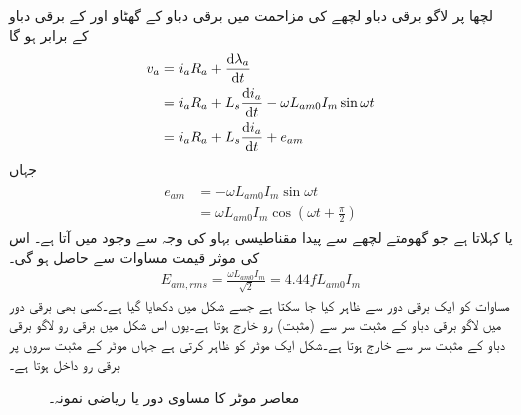 لچھا  پر لاگو برقی دباو لچھے کی مزاحمت  میں برقی دباو کے گھٹاو اور  کے برقی دباو کے برابر ہو گا
\begin{gather}
\begin{aligned}\label{مساوات_معاصر_دباو_مساوی_مزاحمت_گھتاو_اور_پیدا_دباو}
v_a&=i_a R_a+\frac{\dif \lambda_a}{\dif t}\\
&=i_a R_a+L_s \frac{\dif i_a}{\dif t}-\omega L_{am0} I_m \sin \omega t\\
&=i_a R_a+L_s \frac{\dif i_a}{\dif t}+e_{am}
\end{aligned}
\end{gather}
جہاں
\begin{gather}
\begin{aligned}
e_{am}&=-\omega L_{am0} I_m \sin \omega t\\
&=\omega L_{am0} I_m \cos \left (\omega t+\frac{\pi}{2} \right)
\end{aligned}
\end{gather}
 یا  کہلاتا ہے جو گھومتے لچھے سے پیدا مقناطیسی بہاو کی وجہ سے وجود میں آتا ہے۔  اس کی موثر قیمت  مساوات   سے حاصل ہو گی۔
\begin{align}\label{مساوات_معاصر_موثر_پیدا_دباو}
E_{am,rms}=\frac{\omega L_{am0} I_m}{\sqrt{2}}=4.44 f L_{am0} I_m
\end{align}
مساوات   کو ایک برقی دور سے ظاہر کیا جا سکتا ہے جسے شکل   میں دکھایا گیا ہے۔کسی بھی برقی دور میں لاگو برقی دباو کے  مثبت سر سے (مثبت) رو خارج ہوتا ہے۔یوں اس شکل میں برقی رو  لاگو برقی دباو  کے مثبت سر سے خارج ہوتا ہے۔شکل  ایک موٹر کو ظاہر کرتی ہے جہاں موٹر کے مثبت سروں پر برقی رو داخل ہوتا ہے۔
\begin{figure}
\centering
\caption{معاصر موٹر کا مساوی دور یا ریاضی نمونہ۔}
\label{شکل_معاصر_موٹر_کا_مساوی_دور}
\end{figure}

